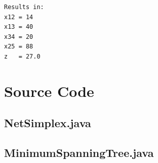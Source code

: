 \documentclass[11pt,a4paper,openany]{report}
\begin{document}
\begin{verbatim}
Results in:
x12 = 14
x13 = 40
x34 = 20
x25 = 88
z   = 27.0
\end{verbatim}

\newpage
\section{Source Code}
\subsection{NetSimplex.java}

\newpage
\subsection{MinimumSpanningTree.java}

\end{document}
